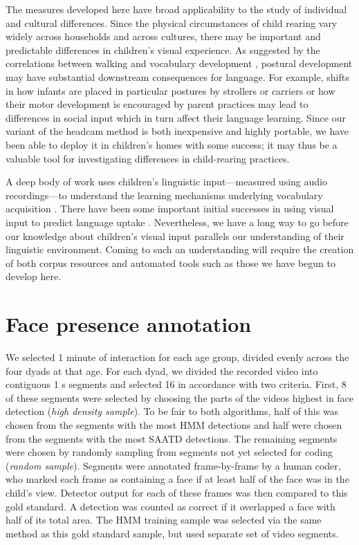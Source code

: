 \documentclass[man,noapacite]{apa2}
\begin{document}
The measures developed here have broad applicability to the study of individual and cultural differences. Since the physical circumstances of child rearing vary widely across households and across cultures, there may be important and predictable differences in children's visual experience. As suggested by the correlations between walking and vocabulary development \cite{walleunderreview}, postural development may have substantial downstream consequences for language. For example, shifts in how infants are placed in particular postures by strollers or carriers \cite{zeedyk2008} or how their motor development is encouraged by parent practices \cite{bril1986} may lead to differences in social input which in turn affect their language learning. Since our variant of the headcam method is both inexpensive and highly portable, we have been able to deploy it in children's homes with some success; it may thus be a valuable tool for investigating differences in child-rearing practices.

A deep body of work uses children's linguistic input---measured using audio recordings---to understand the learning mechanisms underlying vocabulary acquisition \cite{huttenlocher1991,hart1995,fernald2006}. There have been some important initial successes in using visual input to predict language uptake \cite{yuinpress}. Nevertheless, we have a long way to go before our knowledge about children's visual input parallels our understanding of their linguistic environment. Coming to such an understanding will require the creation of both corpus resources and automated tools such as those we have begun to develop here.

\newpage




\newpage

\section{Face presence annotation}

We selected 1 minute of interaction for each age group, divided evenly across the four dyads at that age. For each dyad, we divided the recorded video into contiguous 1 s segments and selected 16 in accordance with two criteria. First, 8 of these segments were selected by choosing the parts of the videos highest in face detection (\emph{high density sample}). To be fair to both algorithms, half of this was chosen from the segments with the most HMM detections and half were chosen from the segments with the most SAATD detections. The remaining segments were chosen by randomly sampling from segments not yet selected for coding (\emph{random sample}). 
Segments were annotated frame-by-frame by a human coder, who marked each frame as containing a face if at least half of the face was in the child's view. Detector output for each of these frames was then compared to this gold standard. A detection was counted as correct if it overlapped a face with half of its total area. The HMM training sample was selected via the same method as this gold standard sample, but used separate set of video segments.

\end{document}
